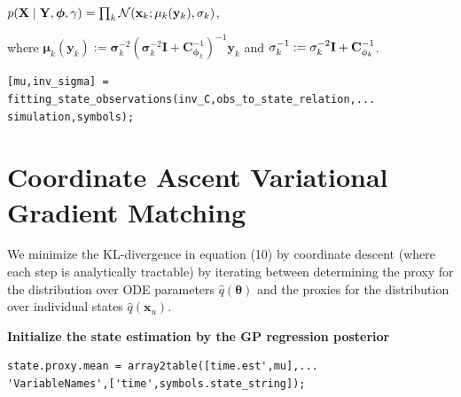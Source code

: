  \vspace{1em}
\begin{par}
$p(\mathbf{X} \mid \mathbf{Y}, \boldsymbol\phi,\gamma) = \prod_k\mathcal{N}(\mathbf{x}_k ;\mathbf\mu_k(\mathbf{y}_k),\mathbf\mathbf{\sigma}_k)$,
\end{par} \vspace{1em}
\begin{par}
where $\mathbf\mu_k(\mathbf{y}_k) := \mathbf{\sigma}_k^{-2} \left(\mathbf{\sigma}_k^{-2}\mathbf{I} + \mathbf{C}_{\boldsymbol\phi_k}^{-1} \right)^{-1} \mathbf{y}_k$ and $\mathbf{\sigma}_k ^{-1}:=\mathbf{\sigma}_k^{-2} \mathbf{I} +\mathbf{C}_{\mathbf\mathbf{\phi}_k}^{-1}$.
\end{par} \vspace{1em}
\color{RoyalPurple}\begin{verbatim}
[mu,inv_sigma] = fitting_state_observations(inv_C,obs_to_state_relation,...
simulation,symbols);
\end{verbatim} 
\color{black}


\section{Coordinate Ascent Variational Gradient Matching}

\begin{par}
We minimize the KL-divergence in equation (10) by coordinate descent (where each step is analytically tractable) by iterating between determining the proxy for the distribution over ODE parameters $\hat{q}(\boldsymbol\theta)$ and the proxies for the distribution over individual states $\hat{q}(\mathbf{x}_u)$.
\end{par} \vspace{1.5em}

\textbf{Initialize the state estimation by the GP regression posterior}
\color{RoyalPurple}\begin{verbatim}
state.proxy.mean = array2table([time.est',mu],...
'VariableNames',['time',symbols.state_string]);
\end{verbatim} 
\color{black}
\vspace{1em}

